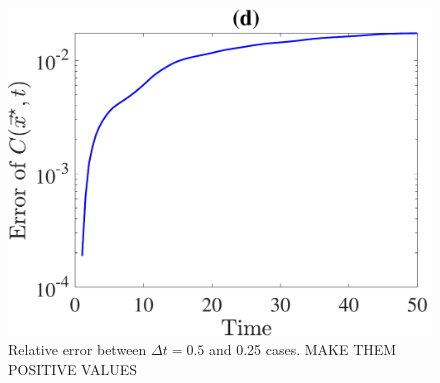 \begin{figure}[h]
\begin{center}
		\includegraphics[scale=0.35]{./figures/fig_NC10_dt_err_C_star}
	\caption{Relative error between $\Delta t = 0.5$ and 0.25 cases. MAKE THEM POSITIVE VALUES}
	\label{fig_NC10_dt_err_all}
\end{center}
\end{figure}

